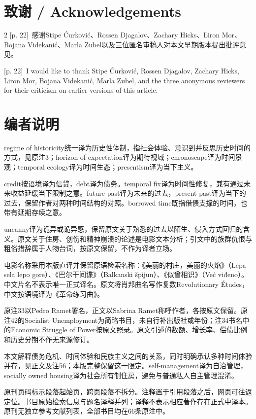 \documentclass[10pt,a4paper]{article}
\begin{document}
\section*{致谢 / Acknowledgements}
\begin{paracol}{2}
{\scriptsize\color{gray} [p. 22]}\ 感谢Stipe Ćurković、Rossen Djagalov、Zachary Hicks、Liron Mor、Bojana Videkanić、Marla Zubel以及三位匿名审稿人对本文早期版本提出批评意见。\par
\switchcolumn
{\scriptsize\color{gray} [p. 22]}\ I would like to thank Stipe Ćurković, Rossen Djagalov, Zachary Hicks, Liron Mor, Bojana Videkanić, Marla Zubel, and the three anonymous reviewers for their criticism on earlier versions of this article.\par
\switchcolumn*
\end{paracol}
\section*{编者说明}{\small
regime of historicity统一译为历史性体制，指社会体验、意识到并反思历史时间的方式，见原注3；horizon of expectation译为期待视域；chronoscape译为时间景观；temporal ecology译为时间生态；presentism译为当下主义。\par
credit按语境译为信贷，debt译为债务。temporal fix译为时间性修复，兼有通过未来收益延缓当下限制之意。future past译为未来的过去，present past译为当下的过去，保留作者对两种时间结构的对照。borrowed time既指借债支撑的时间，也带有延期存续之意。\par
uncanny译为诡异或诡异感，保留原文关于熟悉的过去以陌生、侵入方式回归的含义。原文关于住房、创伤和精神崩溃的论述是电影文本分析；引文中的族群仇恨与粗俗措辞属于人物台词，按原文保留，不作为译者立场。\par
电影名称采用本版直译并保留原语检索名称：《美丽的村庄，美丽的火焰》（Lepa sela lepo gore）、《巴尔干间谍》（Balkanski špijun）、《似曾相识》（Već viđeno）。中文片名不表示唯一正式译名。原文将肖邦曲名写作复数Revolutionary Études，中文按语境译为《革命练习曲》。\par
原注33以Pedro Ramet署名，正文以Sabrina Ramet称呼作者，各按原文保留。原注42的Socialist Unemployment为简略书目，未自行补出版社或年份；注34书名中的Economic Struggle of Power按原文照录。原文引述的数额、增长率、偿债比例和历史分期不作无来源修订。\par
本文解释债务危机、时间体验和民族主义之间的关系，同时明确承认多种时间体验并存，见正文及注56；本版完整保留这一限定。self-management译为自治管理，socially owned housing译为社会所有制住房，避免与普通私人自主管理混淆。\par
原刊页码标示段落起始页，跨页段落不拆分。注释置于引用段落之后，网页可往返定位。书目原始检索信息与题名译释并列；译释不表示相应著作存在正式中译本。原刊无独立参考文献列表，全部书目均在66条原注中。\par
}
\end{document}

